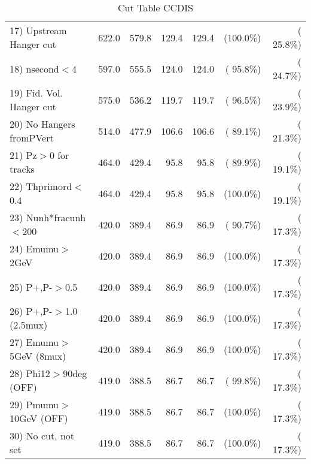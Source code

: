 \begin{table}[h!]
\begin{tabular}{||l||r|r|r|r|r|r||}
 17) Upstream Hanger cut  &        622.0 &        579.8 &        129.4 &        129.4 & (100.0\%) & ( 25.8\%) \\
 18) nsecond$<$4          &        597.0 &        555.5 &        124.0 &        124.0 & ( 95.8\%) & ( 24.7\%) \\
 19) Fid. Vol. Hanger cut &        575.0 &        536.2 &        119.7 &        119.7 & ( 96.5\%) & ( 23.9\%) \\
 20) No Hangers fromPVert &        514.0 &        477.9 &        106.6 &        106.6 & ( 89.1\%) & ( 21.3\%) \\
 21) Pz$>$0 for tracks    &        464.0 &        429.4 &         95.8 &         95.8 & ( 89.9\%) & ( 19.1\%) \\
 22) Thprimord$<$0.4      &        464.0 &        429.4 &         95.8 &         95.8 & (100.0\%) & ( 19.1\%) \\
 23) Nunh*fracunh$<$200   &        420.0 &        389.4 &         86.9 &         86.9 & ( 90.7\%) & ( 17.3\%) \\
 24) Emumu$>$2GeV         &        420.0 &        389.4 &         86.9 &         86.9 & (100.0\%) & ( 17.3\%) \\
 25) P+,P-$>$0.5          &        420.0 &        389.4 &         86.9 &         86.9 & (100.0\%) & ( 17.3\%) \\
 26) P+,P-$>$1.0 (2.5mux) &        420.0 &        389.4 &         86.9 &         86.9 & (100.0\%) & ( 17.3\%) \\
 27) Emumu$>$5GeV  (8mux) &        420.0 &        389.4 &         86.9 &         86.9 & (100.0\%) & ( 17.3\%) \\
 28) Phi12$>$90deg  (OFF) &        419.0 &        388.5 &         86.7 &         86.7 & ( 99.8\%) & ( 17.3\%) \\
 29) Pmumu$>$10GeV  (OFF) &        419.0 &        388.5 &         86.7 &         86.7 & (100.0\%) & ( 17.3\%) \\
 30) No cut, not set      &        419.0 &        388.5 &         86.7 &         86.7 & (100.0\%) & ( 17.3\%) \\
 \hline
 \hline
 \end{tabular}
 \caption{Cut Table  CCDIS    }
 \label{tab-cutcohjpsi-mumu_ncdis}
 \end{table}
